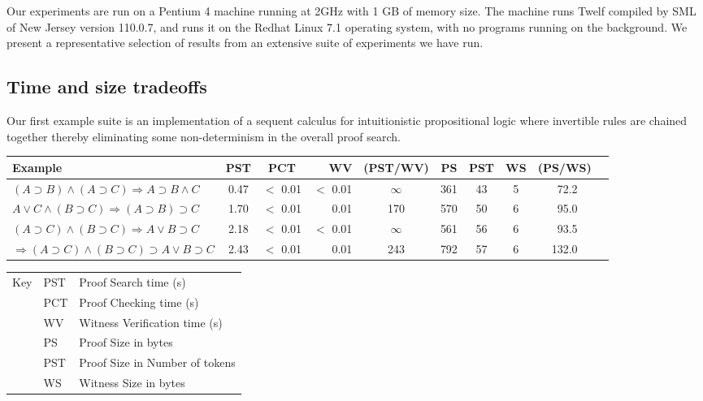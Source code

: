 \documentclass{llncs}
\begin{document}
Our experiments are run on a Pentium 4 machine running at 2GHz with 1
GB of memory size.  The machine runs Twelf compiled by SML of New
Jersey version 110.0.7, and runs it on the Redhat Linux 7.1 operating
system, with no programs running on the background. We present a
representative selection of results from an extensive suite of
experiments we have run.
   

\subsection{Time and size tradeoffs}

Our first example suite is an implementation of a sequent calculus for
intuitionistic propositional logic where invertible rules are chained
together thereby eliminating some non-determinism in the overall proof
search.

\begin{table*}[htbp]
\begin{center}
\begin{small}
\begin{tabular}{|l|c|c|r|c|c|c|c|c|r|}
\hline
Example & PST & PCT & WV & (PST/WV) & PS & PST & WS & (PS/WS)\\
\hline
$(A\supset B)\wedge (A\supset C)\Rightarrow A\supset B\wedge C$
&       0.47 
&     $<$ 0.01
&     $<$  0.01 
& $\infty$
&       361 
&       43 
&       5 
&       \ 72.2\\
$A\vee C\wedge (B\supset C)\Rightarrow (A\supset B)\supset C$
&       1.70 
&      $<$ 0.01
&       0.01
&       170 
&       570 
&       50 
&       6 
&       \ 95.0\\
$(A\supset C)\wedge (B\supset C)\Rightarrow A\vee B\supset C$
&       2.18 
&      $<$ 0.01
&      $<$ 0.01
&      $\infty$ 
&       561 
&       56 
&       6 
&       \ 93.5\\
$\Rightarrow (A\supset C)\wedge (B\supset C)\supset A\vee B\supset C$
&       2.43 
&      $<$ 0.01
&      \ \ 0.01
&       243 
&       792 
&       57 
&       6 
&       132.0\\
\hline
\end{tabular}
\begin{tabular}{ll@{=}l}
Key & PST & Proof Search time (s)\\
&PCT & Proof Checking time (s)\\ 
&WV & Witness Verification time (s)\\ 
&PS & Proof Size in bytes\\
&PST & Proof Size in Number of tokens \\
&WS & Witness Size in bytes\\
\end{tabular} 
\end{small}
\end{center}
\caption{\label{tab:seqtimes}
Sequent Calculus: Times with Caching of User-Selected Predicates}
\end{table*}
\end{document}

